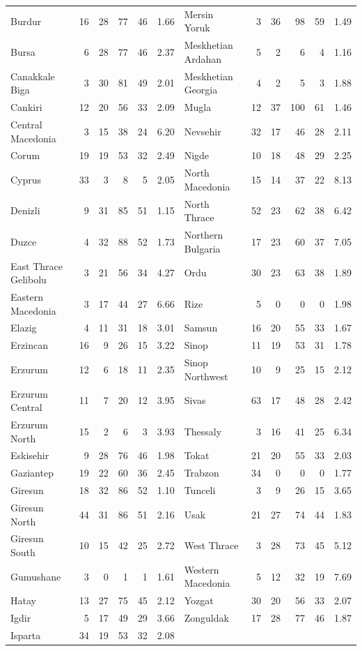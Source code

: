 \begin{tabular}{@{}lrrrrr@{\hspace{14pt}}lrrrrr@{}}
Burdur & 16 & 28 & 77 & 46 & 1.66 & Mersin Yoruk & 3 & 36 & 98 & 59 & 1.49 \\
Bursa & 6 & 28 & 77 & 46 & 2.37 & Meskhetian Ardahan & 5 & 2 & 6 & 4 & 1.16 \\
Canakkale Biga & 3 & 30 & 81 & 49 & 2.01 & Meskhetian Georgia & 4 & 2 & 5 & 3 & 1.88 \\
Cankiri & 12 & 20 & 56 & 33 & 2.09 & Mugla & 12 & 37 & 100 & 61 & 1.46 \\
Central Macedonia & 3 & 15 & 38 & 24 & 6.20 & Nevsehir & 32 & 17 & 46 & 28 & 2.11 \\
Corum & 19 & 19 & 53 & 32 & 2.49 & Nigde & 10 & 18 & 48 & 29 & 2.25 \\
Cyprus & 33 & 3 & 8 & 5 & 2.05 & North Macedonia & 15 & 14 & 37 & 22 & 8.13 \\
Denizli & 9 & 31 & 85 & 51 & 1.15 & North Thrace & 52 & 23 & 62 & 38 & 6.42 \\
Duzce & 4 & 32 & 88 & 52 & 1.73 & Northern Bulgaria & 17 & 23 & 60 & 37 & 7.05 \\
East Thrace Gelibolu & 3 & 21 & 56 & 34 & 4.27 & Ordu & 30 & 23 & 63 & 38 & 1.89 \\
Eastern Macedonia & 3 & 17 & 44 & 27 & 6.66 & Rize & 5 & 0 & 0 & 0 & 1.98 \\
Elazig & 4 & 11 & 31 & 18 & 3.01 & Samsun & 16 & 20 & 55 & 33 & 1.67 \\
Erzincan & 16 & 9 & 26 & 15 & 3.22 & Sinop & 11 & 19 & 53 & 31 & 1.78 \\
Erzurum & 12 & 6 & 18 & 11 & 2.35 & Sinop Northwest & 10 & 9 & 25 & 15 & 2.12 \\
Erzurum Central & 11 & 7 & 20 & 12 & 3.95 & Sivas & 63 & 17 & 48 & 28 & 2.42 \\
Erzurum North & 15 & 2 & 6 & 3 & 3.93 & Thessaly & 3 & 16 & 41 & 25 & 6.34 \\
Eskisehir & 9 & 28 & 76 & 46 & 1.98 & Tokat & 21 & 20 & 55 & 33 & 2.03 \\
Gaziantep & 19 & 22 & 60 & 36 & 2.45 & Trabzon & 34 & 0 & 0 & 0 & 1.77 \\
Giresun & 18 & 32 & 86 & 52 & 1.10 & Tunceli & 3 & 9 & 26 & 15 & 3.65 \\
Giresun North & 44 & 31 & 86 & 51 & 2.16 & Usak & 21 & 27 & 74 & 44 & 1.83 \\
Giresun South & 10 & 15 & 42 & 25 & 2.72 & West Thrace & 3 & 28 & 73 & 45 & 5.12 \\
Gumushane & 3 & 0 & 1 & 1 & 1.61 & Western Macedonia & 5 & 12 & 32 & 19 & 7.69 \\
Hatay & 13 & 27 & 75 & 45 & 2.12 & Yozgat & 30 & 20 & 56 & 33 & 2.07 \\
Igdir & 5 & 17 & 49 & 29 & 3.66 & Zonguldak & 17 & 28 & 77 & 46 & 1.87 \\
Isparta & 34 & 19 & 53 & 32 & 2.08 &  & & & & &  \\
\bottomrule
\end{tabular}
